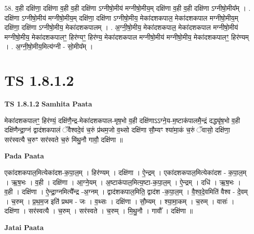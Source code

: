 \documentclass[17pt]{extarticle}
\begin{document}
58. व॒ही दक्षि॑णा॒ दक्षि॑णा व॒ही व॒ही दक्षि॑णा ऽग्नीषो॒मीय॑ मग्नीषो॒मीय॒म् दक्षि॑णा व॒ही व॒ही 
दक्षि॑णा ऽग्नीषो॒मीय᳚म् । . दक्षि॑णा ऽग्नीषो॒मीय॑ मग्नीषो॒मीय॒म् दक्षि॑णा॒ दक्षि॑णा ऽग्नीषो॒मीय॒ मेका॑दशकपाल॒ मेका॑दशकपाल मग्नीषो॒मीय॒म् दक्षि॑णा॒ दक्षि॑णा ऽग्नीषो॒मीय॒ मेका॑दशकपालम् । . अ॒ग्नी॒षो॒मीय॒ मेका॑दशकपाल॒ मेका॑दशकपाल मग्नीषो॒मीय॑ मग्नीषो॒मीय॒ मेका॑दशकपालꣳ॒॒ हिर॑ण्यꣳ॒॒ हिर॑ण्य॒ मेका॑दशकपाल मग्नीषो॒मीय॑ मग्नीषो॒मीय॒ मेका॑दशकपालꣳ॒॒ हिर॑ण्यम् । . अ॒ग्नी॒षो॒मीय॒मित्य॑ग्नी - सो॒मीय᳚म् । \newline
\pagebreak
{}
\section*{ TS 1.8.1.2 }

\textbf{TS 1.8.1.2 } \newline
\textbf{Samhita Paata} \newline

मेका॑दशकपालꣳ॒॒ हिर॑ण्यं॒ दक्षि॑णै॒न्द्र-मेका॑दशकपाल-मृष॒भो व॒ही दक्षि॑णाऽऽग्ने॒य-म॒ष्टाक॑पालमै॒न्द्रं दद्ध्यृ॑ष॒भो व॒ही दक्षि॑णैन्द्रा॒ग्नं द्वाद॑शकपालं ॅवैश्वदे॒वं च॒रुं प्र॑थम॒जो व॒थ्सो दक्षि॑णा सौ॒म्यꣳ श्या॑मा॒कं च॒रुं ॅवासो॒ दक्षि॑णा॒ सर॑स्वत्यै च॒रुꣳ सर॑स्वते च॒रुं मि॑थु॒नौ गावौ॒ दक्षि॑णा ॥ \newline

\textbf{Pada Paata} \newline

एका॑दशकपाल॒मित्येका॑दश-क॒पा॒ल॒म् । हिर॑ण्यम् । दक्षि॑णा । ऐ॒न्द्रम् । एका॑दशकपाल॒मित्येका॑दश - क॒पा॒ल॒म् । ऋ॒ष॒भः । व॒ही । दक्षि॑णा । आ॒ग्ने॒यम् । अ॒ष्टाक॑पाल॒मित्य॒ष्टा-क॒पा॒ल॒म् । ऐ॒न्द्रम् । दधि॑ । ऋ॒ष॒भः । व॒ही । दक्षि॑णा । ऐ॒न्द्रा॒ग्नमित्यै᳚न्द्र -अ॒ग्नम् । द्वाद॑शकपाल॒मिति॒ द्वाद॑श -क॒पा॒ल॒म् । वै॒श्व॒दे॒वमिति॑ वैश्व - दे॒वम् । च॒रुम् । प्र॒थ॒म॒ज इति॑ प्रथम - जः । व॒थ्सः । दक्षि॑णा । सौ॒म्यम् । श्या॒मा॒कम् । च॒रुम् । वासः॑ । दक्षि॑णा । सर॑स्वत्यै । च॒रुम् । सर॑स्वते । च॒रुम् । मि॒थु॒नौ । गावौ᳚ । दक्षि॑णा ॥  \newline



\textbf{Jatai Paata} \newline
\end{document}

